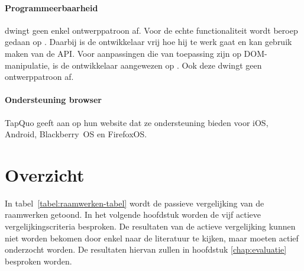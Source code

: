 \paragraph{Programmeerbaarheid}
\label{sec:lungo-programmeerbaarheid}
\lungo{} dwingt geen enkel ontwerppatroon af.
Voor de echte functionaliteit wordt beroep gedaan op \js{}.
Daarbij is de ontwikkelaar vrij hoe hij te werk gaat en kan gebruik maken van de \lungo{} API. 
Voor aanpassingen die van toepassing zijn op DOM-manipulatie, is de ontwikkelaar aangewezen op \quo{}.
Ook deze dwingt geen ontwerppatroon af.

\paragraph{Ondersteuning browser}
TapQuo geeft aan op hun website dat ze ondersteuning bieden voor iOS, Android, Blackberry~OS en FirefoxOS.


\section{Overzicht}
\label{sec:raamwerken-tabel}

In tabel~\ref{tabel:raamwerken-tabel} wordt de passieve vergelijking van de raamwerken getoond.
In het volgende hoofdstuk worden de vijf actieve vergelijkingscriteria besproken.
De resultaten van de actieve vergelijking kunnen niet worden bekomen door enkel naar de literatuur te kijken, maar moeten actief onderzocht worden.
De resultaten hiervan zullen in hoofdstuk \ref{chap:evaluatie} besproken worden.

\begin{landscape}
\begin{table}
\centering
{}
\caption{Passieve vergelijking van \st{}, \kendo{}, \jqm{} en \lungo{}}
\label{tabel:raamwerken-tabel}
\end{table}
\end{landscape}
